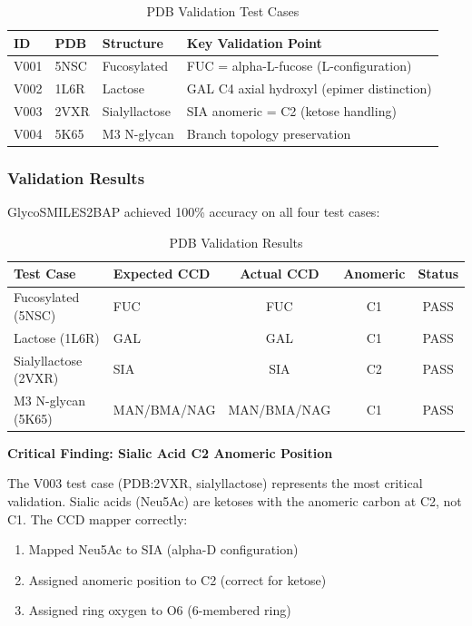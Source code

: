 \documentclass[11pt,a4paper]{article}
\begin{document}
\begin{table}[h]
\centering
\caption{PDB Validation Test Cases}
\begin{tabular}{lllp{5cm}}
\toprule
ID & PDB & Structure & Key Validation Point \\
\midrule
V001 & 5NSC & Fucosylated & FUC = alpha-L-fucose (L-configuration) \\
V002 & 1L6R & Lactose & GAL C4 axial hydroxyl (epimer distinction) \\
V003 & 2VXR & Sialyllactose & SIA anomeric = C2 (ketose handling) \\
V004 & 5K65 & M3 N-glycan & Branch topology preservation \\
\bottomrule
\end{tabular}
\label{tab:pdb_cases}
\end{table}

\subsubsection{Validation Results}

GlycoSMILES2BAP achieved 100\% accuracy on all four test cases:

\begin{table}[h]
\centering
\caption{PDB Validation Results}
\begin{tabular}{llccc}
\toprule
Test Case & Expected CCD & Actual CCD & Anomeric & Status \\
\midrule
Fucosylated (5NSC) & FUC & FUC & C1 & PASS \\
Lactose (1L6R) & GAL & GAL & C1 & PASS \\
Sialyllactose (2VXR) & SIA & SIA & C2 & PASS \\
M3 N-glycan (5K65) & MAN/BMA/NAG & MAN/BMA/NAG & C1 & PASS \\
\bottomrule
\end{tabular}
\label{tab:pdb_results}
\end{table}

\textbf{Critical Finding: Sialic Acid C2 Anomeric Position}

The V003 test case (PDB:2VXR, sialyllactose) represents the most critical validation. Sialic acids (Neu5Ac) are ketoses with the anomeric carbon at C2, not C1. The CCD mapper correctly:
\begin{enumerate}
\item Mapped Neu5Ac to SIA (alpha-D configuration)
\item Assigned anomeric position to C2 (correct for ketose)
\item Assigned ring oxygen to O6 (6-membered ring)
\end{enumerate}
\end{document}
